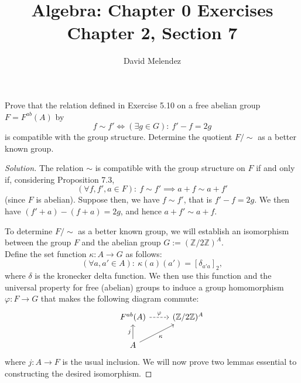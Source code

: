 \documentclass[12pt]{article}
\newenvironment{problem}[2][Problem]{\begin{trivlist}
\item[\hskip \labelsep {\bfseries #1}\hskip \labelsep {\bfseries #2.}]}{\end{trivlist}}
\newenvironment{solution}
  {\renewcommand\qedsymbol{$\blacksquare$}\begin{proof}[Solution]}
{\end{proof}}
\theoremstyle{remark}
\begin{document}
\title{Algebra: Chapter 0 Exercises\\ \large Chapter 2, Section 7}
\author{David Melendez}
\maketitle

\begin{problem}{7.4}
  Prove that the relation defined in Exercise 5.10 on a free abelian group $F = F^{ab}(A)$ by 
  \begin{equation*}
    f \sim f' \Leftrightarrow (\exists g\in G): ~ f'-f = 2g
  \end{equation*}
  is compatible with the group structure.
  Determine the quotient $F/{\sim}$ as a better known group.
\end{problem}
\begin{solution}
  The relation $\sim$ is compatible with the group structure on $F$ if and only if, considering 
  Proposition 7.3,
  \begin{equation*}
    (\forall f,f',a\in F): ~ f\sim f'\implies a+f\sim a+f' 
  \end{equation*}
  (since $F$ is abelian).
  Suppose then, we have $f\sim f'$, that is $f' - f = 2g$.
  We then have $(f' + a) - (f + a) = 2g$, and hence $a+f'\sim a+f$.

  To determine $F/{\sim}$ as a better known group, we will establish an isomorphism between the group $F$ and the abelian group 
  $G := (\mathbb{Z}/2\mathbb{Z})^A$. \\
  Define the set function $\kappa : A\to G$ as follows:
  \begin{equation*}
    (\forall a,a'\in A):~ \kappa(a)(a') = [\delta_{a'a}]_2,
  \end{equation*}
  where $\delta$ is the kronecker delta function.
  We then use this function and the universal property for free (abelian) groups to induce a group
  homomorphism $\varphi : F\to G$ that makes the following diagram commute:
  \[ \begin{tikzcd}
    & F^{ab}(A) \ar[dashed]{r}{\varphi} & (\mathbb{Z}/2\mathbb{Z})^A \\
    & A \ar{u}{j} \ar{ur}[swap]{\kappa}
  \end{tikzcd} \]
  where $j : A\to F$ is the usual inclusion.
  We will now prove two lemmas essential to constructing the desired isomorphism.

  \newpage


\end{solution}
\end{document}
